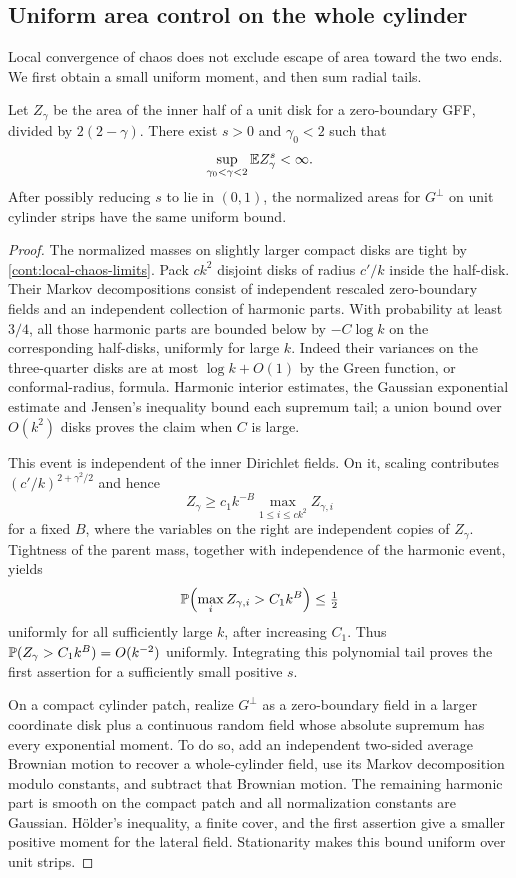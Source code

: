 \subsection{Uniform area control on the whole cylinder}\label{cont:tail-section}

Local convergence of chaos does not exclude escape of area toward the two
ends.  We first obtain a small uniform moment, and then sum radial tails.

\begin{lemma}\label{cont:fractional-moment}
Let $Z_\gamma$ be the area of the inner half of a unit disk for a zero-boundary
GFF, divided by $2(2-\gamma)$.  There exist $s>0$ and $\gamma_0<2$ such that
\[
 \sup_{\gamma_0<\gamma<2}\mathbb E Z_\gamma^s<\infty.
\]
After possibly reducing $s$ to lie in $(0,1)$, the normalized areas for
$G^\perp$ on unit cylinder strips have the same uniform bound.
\end{lemma}

\begin{proof}
The normalized masses on slightly larger compact disks are tight by
\eqref{cont:local-chaos-limits}.  Pack $c k^2$ disjoint disks of radius $c'/k$
inside the half-disk.  Their Markov decompositions consist of independent
rescaled zero-boundary fields and an independent collection of harmonic
parts.  With probability at least $3/4$, all those harmonic parts are bounded
below by $-C\log k$ on the corresponding half-disks, uniformly for large $k$.
Indeed their variances on the three-quarter disks are at most
$\log k+O(1)$ by the Green function, or conformal-radius, formula.  Harmonic
interior estimates, the Gaussian exponential estimate and Jensen's inequality
bound each supremum tail; a union bound over $O(k^2)$ disks proves the claim
when $C$ is large.

This event is independent of the inner Dirichlet fields.  On it, scaling
contributes $(c'/k)^{2+\gamma^2/2}$ and hence
\[
 Z_\gamma\geq c_1 k^{-B}\max_{1\leq i\leq c k^2}Z_{\gamma,i}
\]
for a fixed $B$, where the variables on the right are independent copies of
$Z_\gamma$.  Tightness of the parent mass, together with independence of the
harmonic event, yields
\[
 \mathbb P\!\left(\max_i Z_{\gamma,i}>C_1k^B\right)\leq\tfrac12
\]
uniformly for all sufficiently large $k$, after increasing $C_1$.  Thus
$\mathbb P(Z_\gamma>C_1k^B)=O(k^{-2})$ uniformly.  Integrating this polynomial
tail proves the first assertion for a sufficiently small positive $s$.

On a compact cylinder patch, realize $G^\perp$ as a zero-boundary field in a
larger coordinate disk plus a continuous random field whose absolute
supremum has every exponential moment.  To do so, add an independent
two-sided average Brownian motion to recover a whole-cylinder field, use
its Markov decomposition modulo constants, and subtract that Brownian
motion.  The remaining harmonic part is smooth on the compact patch and
all normalization constants are Gaussian.  H\"older's inequality, a finite
cover, and the first assertion give a smaller positive moment for the
lateral field.  Stationarity makes this bound uniform over unit strips.
\end{proof}

